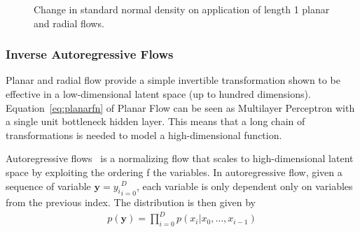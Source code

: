 \documentclass[runningheads]{llncs}
\begin{document}
\begin{figure}
	\centering
	\caption{Change in standard normal density on application of length 1 planar and radial flows.}
	\label{fig:planarradial}
\end{figure}

\subsubsection{Inverse Autoregressive Flows} Planar and radial flow provide a simple invertible transformation shown to be effective in a low-dimensional latent space (up to hundred dimensions). Equation~\ref{eq:planarfn} of Planar Flow can be seen as Multilayer Perceptron with a single unit bottleneck hidden layer. This means that a long chain of transformations is needed to model a high-dimensional function. 

Autoregressive flows~\cite{germain2015made} is a normalizing flow that scales to high-dimensional latent space by exploiting the ordering f the variables. In autoregressive flow, given a sequence of variable $\mathbf{y} = {y_i}_{i=0}^D$, each variable is only dependent only on variables from the previous index. The distribution is then given by
\begin{align}
p(\mathbf{y}) = \prod_{i=0}^{D} p(x_i | x_0,\dots,x_{i-1})
\end{align} 	 
\end{document}
